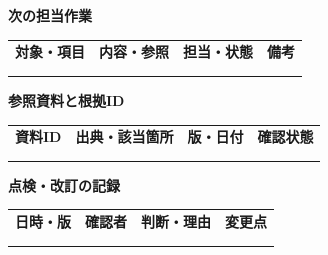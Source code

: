 \documentclass[11pt,a4paper]{article}
\begin{document}
\par{}\noindent\textbf{次の担当作業}\par\vspace{1mm}
{\fontsize{8.5}{13}\selectfont
\begin{tabularx}{\linewidth}{@{}XXXX@{}}
\textbf{対象・項目} & \textbf{内容・参照} & \textbf{担当・状態} & \textbf{備考}\\[2mm]
\strut & \strut & \strut & \strut\\[5mm]
\strut & \strut & \strut & \strut\\[5mm]
\end{tabularx}
}\vspace{2mm}\par
{}
\par{}\noindent\textbf{参照資料と根拠ID}\par\vspace{1mm}
{\fontsize{8.5}{13}\selectfont
\begin{tabularx}{\linewidth}{@{}XXXX@{}}
\textbf{資料ID} & \textbf{出典・該当箇所} & \textbf{版・日付} & \textbf{確認状態}\\[2mm]
\strut & \strut & \strut & \strut\\[5mm]
\strut & \strut & \strut & \strut\\[5mm]
\end{tabularx}
}\vspace{2mm}\par
{}
\par{}\noindent\textbf{点検・改訂の記録}\par\vspace{1mm}
{\fontsize{8.5}{13}\selectfont
\begin{tabularx}{\linewidth}{@{}XXXX@{}}
\textbf{日時・版} & \textbf{確認者} & \textbf{判断・理由} & \textbf{変更点}\\[2mm]
\strut & \strut & \strut & \strut\\[5mm]
\strut & \strut & \strut & \strut\\[5mm]
\end{tabularx}
}\vspace{2mm}\par
\end{document}

